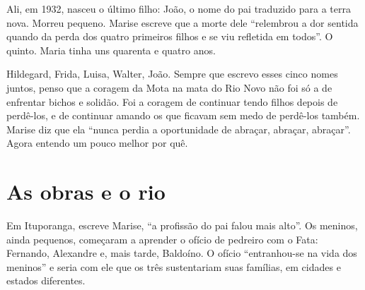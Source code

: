 \documentclass[
  brazilian,
  11pt,
  openany]{book}
\begin{document}
Ali, em 1932, nasceu o último filho: João, o nome do pai traduzido para
a terra nova. Morreu pequeno. Marise escreve que a morte dele
``relembrou a dor sentida quando da perda dos quatro primeiros filhos e
se viu refletida em todos''. O quinto. Maria tinha uns quarenta e quatro
anos.

Hildegard, Frida, Luisa, Walter, João. Sempre que escrevo esses cinco
nomes juntos, penso que a coragem da Mota na mata do Rio Novo não foi só
a de enfrentar bichos e solidão. Foi a coragem de continuar tendo filhos
depois de perdê-los, e de continuar amando os que ficavam sem medo de
perdê-los também. Marise diz que ela ``nunca perdia a oportunidade de
abraçar, abraçar, abraçar''. Agora entendo um pouco melhor por quê.

\section{As obras e o rio}\label{as-obras-e-o-rio}

Em Ituporanga, escreve Marise, ``a profissão do pai falou mais alto''.
Os meninos, ainda pequenos, começaram a aprender o ofício de pedreiro
com o Fata: Fernando, Alexandre e, mais tarde, Baldoíno. O ofício
``entranhou-se na vida dos meninos'' e seria com ele que os três
sustentariam suas famílias, em cidades e estados diferentes.
\end{document}

